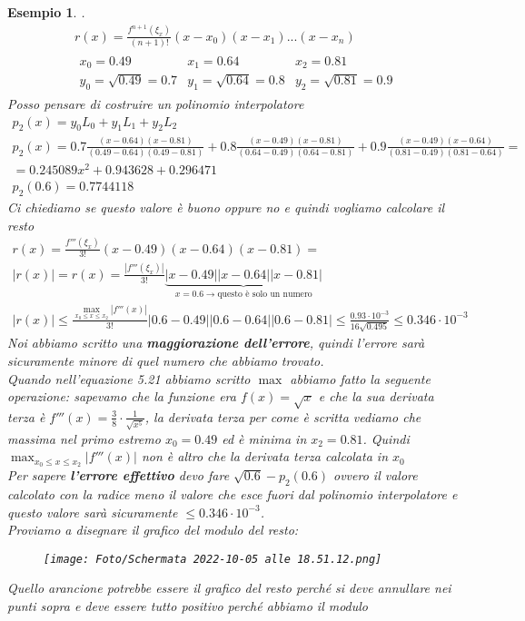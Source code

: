 \documentclass[a4paper, portrait]{book}
\numberwithin{equation}{chapter} %
\newtheorem{example}{Esempio}
\begin{document}
\begin{example}.
    \begin{gather}
        r(x) = \frac{f^{n+1}(\xi_x)}{(n+1)!}(x-x_0)(x-x_1)...(x-x_n)\\
        \begin{matrix}
            x_0 = 0.49&x_1 = 0.64&x_2 = 0.81\\
            y_0 = \sqrt{0.49} = 0.7&y_1 = \sqrt{0.64} = 0.8&y_2 = \sqrt{0.81} =0.9
        \end{matrix}
    \end{gather}
    Posso pensare di costruire un polinomio interpolatore
    \begin{gather}
        p_2(x) = y_0L_0 + y_1L_1 + y_2L_2\\
        p_2(x) = 0.7\frac{(x-0.64)(x-0.81)}{(0.49-0.64)(0.49-0.81)}+0.8\frac{(x-0.49)(x-0.81)}{(0.64-0.49)(0.64-0.81)}+0.9\frac{(x-0.49)(x-0.64)}{(0.81-0.49)(0.81-0.64)} =\\= 0.245089 x^2 + 0.943628 + 0.296471\\
        p_2(0.6) = 0.7744118
    \end{gather}
    Ci chiediamo se questo valore è buono oppure no e quindi vogliamo calcolare il resto
    \begin{gather}
        r(x) = \frac{f'''(\xi_x)}{3!}(x-0.49)(x-0.64)(x-0.81)=\\
        |r(x)| = r(x) = \frac{|f'''(\xi_x)|}{3!}\underbrace{|x-0.49||x-0.64||x-0.81|}_{x = 0.6 \rightarrow \text{questo è solo un numero}}\\
        |r(x)| \leq \frac{\max_{x_0\leq x \leq x_2}|f'''(x)|}{3!}|0.6-0.49||0.6-0.64||0.6-0.81|\leq \frac{0.93\cdot 10^{-3}}{16\sqrt{0.495}}\leq 0.346\cdot 10^{-3}
    \end{gather}
    Noi abbiamo scritto una \textbf{maggiorazione dell'errore}, quindi l'errore sarà sicuramente minore di quel numero che abbiamo trovato.\\
    Quando nell'equazione 5.21 abbiamo scritto $\max$ abbiamo fatto la seguente operazione: sapevamo che la funzione era $f(x) = \sqrt{x}$ e che la sua derivata terza è $f'''(x) = \frac{3}{8}\cdot \frac{1}{\sqrt{x^5}}$, la derivata terza per come è scritta vediamo che massima nel primo estremo $x_0 = 0.49$ ed è minima in $x_2 = 0.81$. Quindi $\max_{x_0\leq x \leq x_2}|f'''(x)|$ non è altro che la derivata terza calcolata in $x_0$
    \\Per sapere \textbf{l'errore effettivo} devo fare $\sqrt{0.6} - p_2(0.6)$ ovvero il valore calcolato con la radice meno il valore che esce fuori dal polinomio interpolatore e questo valore sarà sicuramente $\leq 0.346 \cdot 10^{-3}$.\\
    Proviamo a disegnare il grafico del modulo del resto:
    \begin{figure}[h!]
        \centering
        \texttt{[image: Foto/Schermata 2022-10-05 alle 18.51.12.png]}
        \caption{}
    \end{figure}
    Quello arancione potrebbe essere il grafico del resto perché si deve annullare nei punti sopra e deve essere tutto positivo perché abbiamo il modulo
\end{example}
\end{document}
